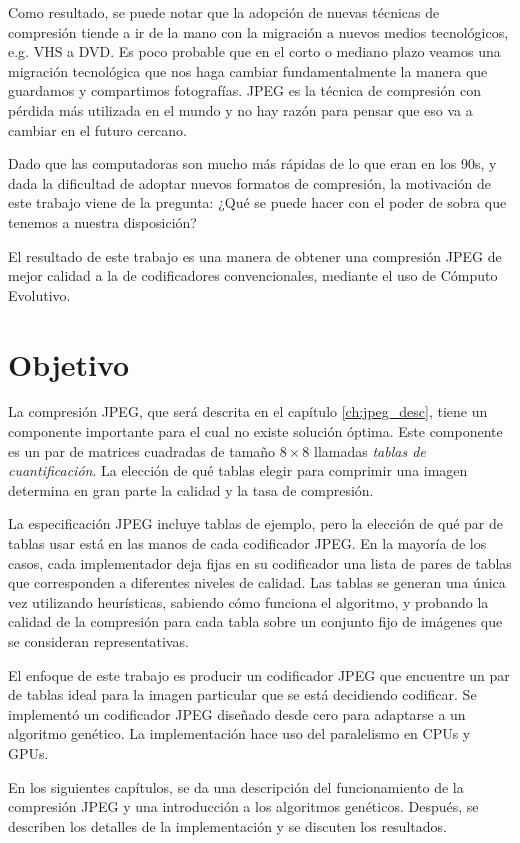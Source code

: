 Como resultado, se puede notar que la adopción de nuevas técnicas de compresión
tiende a ir de la mano con la migración a nuevos medios tecnológicos, e.g. VHS
a DVD. Es poco probable que en el corto o mediano plazo veamos una migración
tecnológica que nos haga cambiar fundamentalmente la manera que guardamos y
compartimos fotografías. JPEG es la técnica de \gls{compresión con pérdida} más
utilizada en el mundo y no hay razón para pensar que eso va a cambiar en el
futuro cercano.

Dado que las computadoras son mucho más rápidas de lo que eran en los 90s, y
dada la dificultad de adoptar nuevos formatos de compresión, la motivación de
este trabajo viene de la pregunta:  ¿Qué se puede hacer con el poder de sobra
que tenemos a nuestra disposición?

El resultado de este trabajo es una manera de obtener una compresión JPEG de mejor
calidad a la de codificadores convencionales, mediante el uso de \gls{Cómputo Evolutivo}.

\section{Objetivo}

La compresión JPEG, que será descrita en el capítulo \ref{ch:jpeg_desc}, tiene
un componente importante para el cual no existe solución óptima. Este
componente es un par de matrices cuadradas de tamaño $8\times8$ llamadas
\emph{\gls{tablas de cuantificación}}. La elección de qué tablas elegir para
comprimir una imagen determina en gran parte la calidad y la tasa de compresión.

La especificación JPEG \cite{jpeg-spec} incluye tablas de ejemplo, pero la
elección de qué par de tablas usar está en las manos de cada codificador
JPEG. En la mayoría de los casos, cada implementador deja fijas en su
codificador una lista de pares de tablas que corresponden a diferentes
niveles de calidad. Las tablas se generan una única vez utilizando heurísticas,
sabiendo cómo funciona el algoritmo, y probando la calidad de la compresión
para cada tabla sobre un conjunto fijo de imágenes que se consideran
representativas.

El enfoque de este trabajo es producir un codificador JPEG que encuentre un par
de tablas ideal para la imagen particular que se está decidiendo codificar.
Se implementó un codificador JPEG diseñado desde cero para adaptarse a un
algoritmo genético. La implementación hace uso del paralelismo en CPUs y GPUs.

En los siguientes capítulos, se da una descripción del funcionamiento de la
compresión JPEG y una introducción a los algoritmos genéticos. Después, se
describen los detalles de la implementación y se discuten los resultados.


